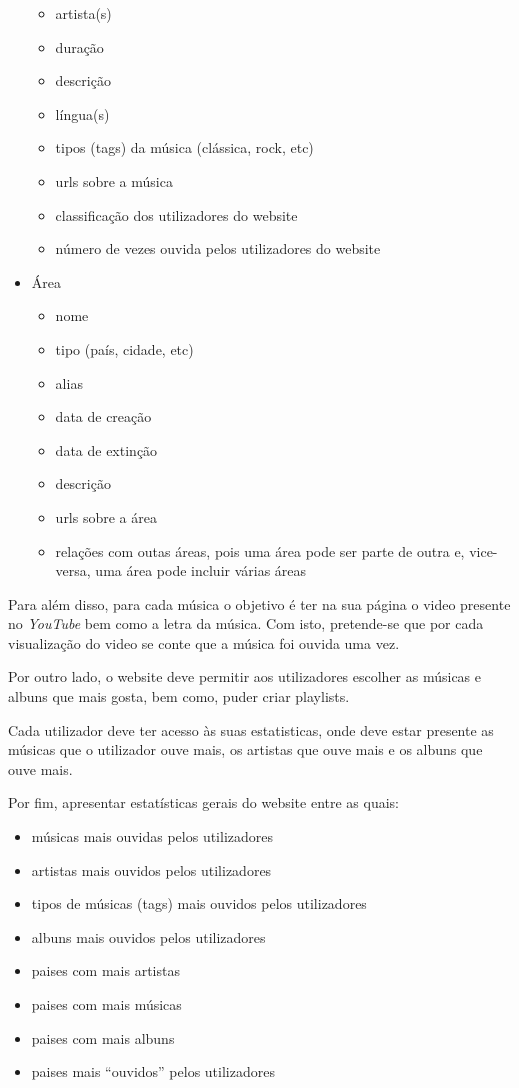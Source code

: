 \documentclass{article}
\begin{document}
\begin{itemize}
\begin{itemize}
            \item artista(s)
            \item duração
            \item descrição
            \item língua(s)
            \item tipos (tags) da música (clássica, rock, etc)
            \item urls sobre a música
            \item classificação dos utilizadores do website
            \item número de vezes ouvida pelos utilizadores do website
        \end{itemize}
    \item Área
        \begin{itemize}
            \item nome
            \item tipo (país, cidade, etc)
            \item alias
            \item data de creação
            \item data de extinção
            \item descrição
            \item urls sobre a área
            \item relações com outas áreas, pois uma área pode ser parte de outra e, vice-versa, uma área pode incluir várias áreas
        \end{itemize}
\end{itemize}

Para além disso, para cada música o objetivo é ter na sua página o video presente no \textit{YouTube} bem como a letra da música. Com isto, pretende-se que por cada visualização do video se conte que a música foi ouvida uma vez.

Por outro lado, o website deve permitir aos utilizadores escolher as músicas e albuns que mais gosta, bem como, puder criar playlists.

Cada utilizador deve ter acesso às suas estatisticas, onde deve estar presente as músicas que o utilizador ouve mais, os artistas que ouve mais e os albuns que ouve mais.

Por fim, apresentar estatísticas gerais do website entre as quais:
\begin{itemize}
    \item músicas mais ouvidas pelos utilizadores
    \item artistas mais ouvidos pelos utilizadores
    \item tipos de músicas (tags) mais ouvidos pelos utilizadores
    \item albuns mais ouvidos pelos utilizadores
    \item paises com mais artistas
    \item paises com mais músicas
    \item paises com mais albuns
    \item paises mais ``ouvidos'' pelos utilizadores
\end{itemize}
\end{document}
